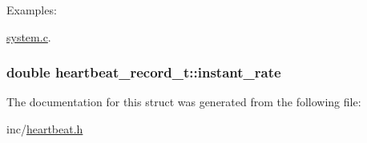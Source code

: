 \begin{Desc}
\item[Examples: ]\par
\hyperlink{system_8c-example}{system.c}.\end{Desc}
\hypertarget{structheartbeat__record__t_8b6c1c4cd6ef723694e3aadad0cf4e6e}{
\subsubsection[instant\_\-rate]{\setlength{\rightskip}{0pt plus 5cm}double {\bf heartbeat\_\-record\_\-t::instant\_\-rate}}}
\label{structheartbeat__record__t_8b6c1c4cd6ef723694e3aadad0cf4e6e}




The documentation for this struct was generated from the following file:\begin{CompactItemize}
\item 
inc/\hyperlink{heartbeat_8h}{heartbeat.h}\end{CompactItemize}
